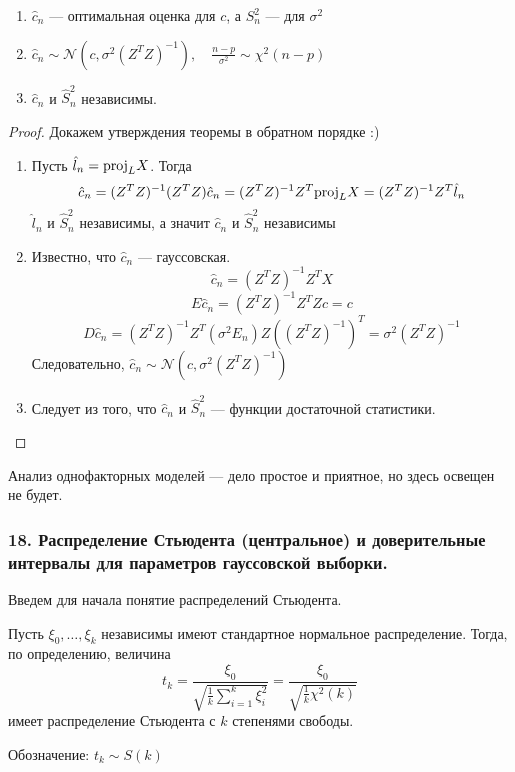 \documentclass[12pt, russian]{article}
\begin{document}
\begin{theorem}
\begin{enumerate}
\item $\hat{c}_n$ --- оптимальная оценка для $c$, а $S_n^2$ --- для $\sigma^2$
\item $\hat{c}_n\sim\mathcal{N}(c, \sigma^2(Z^TZ)^{-1}),\quad\frac{n - p}{\sigma^2}\sim\chi^2(n - p)$
\item $\hat{c}_n$ и $\hat{S}_n^2$ независимы.
\end{enumerate}
\end{theorem}
\begin{proof}
Докажем утверждения теоремы в обратном порядке :)
\begin{enumerate}
\item Пусть $\hat{l}_n = \text{proj}_{L}{X}$. Тогда
$$ \hat{c}_n = (Z^TZ)^{-1}(Z^TZ)\hat{c}_n = (Z^TZ)^{-1}Z^T\text{proj}_{L}{X} = (Z^TZ)^{-1}Z^T\hat{l}_n $$
$\hat{l}_n$ и $\hat{S}_n^2$ независимы, а значит $\hat{c}_n$ и $\hat{S}_n^2$ независимы
\item Известно, что $\hat{c}_n$ --- гауссовская.
$$ \hat{c}_n = (Z^TZ)^{-1}Z^TX $$
$$ E\hat{c}_n = (Z^TZ)^{-1}Z^TZc = c$$
$$ D\hat{c}_n = (Z^TZ)^{-1}Z^T(\sigma^2E_n)Z((Z^TZ)^{-1})^T = \sigma^2(Z^TZ)^{-1}$$
Следовательно, $\hat{c}_n\sim\mathcal{N}(c, \sigma^2(Z^TZ)^{-1})$
\item Следует из того, что $ \hat{c}_n$ и $\hat{S}_n^2$ --- функции достаточной статистики.
\end{enumerate}
\end{proof}

\noindent Анализ однофакторных моделей --- дело простое и приятное, но здесь освещен не будет.

\newpage
\subsubsection*{18. Распределение Стьюдента (центральное) и доверительные интервалы для параметров гауссовской выборки.}

\noindent Введем для начала понятие распределений Стьюдента.
\begin{mydef}
Пусть $\xi_0,\ldots,\xi_k$ независимы имеют стандартное нормальное распределение. Тогда, по определению, величина
$$ t_k = \frac{\xi_0}{\sqrt{\frac{1}{k}\sum\limits_{i = 1}^k{\xi_i^2}}} = \frac{\xi_0}{\sqrt{\frac{1}{k}\chi^2(k)}} $$
имеет распределение Стьюдента с $k$ степенями свободы.

Обозначение: $t_k\sim S(k)$
\end{mydef}
\end{document}
